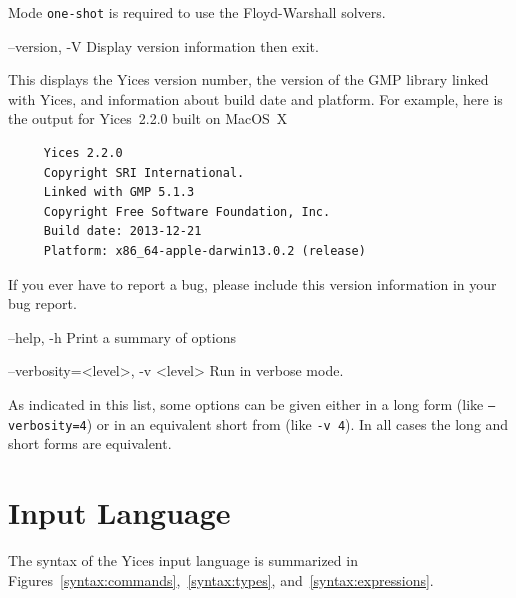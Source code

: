 \documentclass[11pt,twoside,fleqn,openright,titlepage]{cslreport}
\newenvironment{options}{
\begin{list}{}{
\setlength{\labelsep}{1.8ex}
\setlength{\labelwidth}{0pt}
\setlength{\itemindent}{-0.5\leftmargin}
\settowidth{\leftmargin}{\texttt{--}}
\renewcommand{\makelabel}{\optionlabel}}}
{\end{list}}
\newcommand*\optionlabel[1]{\hspace\labelsep\texttt{#1}}
\begin{document}
\begin{options}
  Mode \texttt{one-shot} is required to use the Floyd-Warshall solvers.

\item[--version, -V] Display version information then exit.

  This  displays the  Yices version  number,  the version  of the  GMP
  library  linked with  Yices, and  information about  build date  and
  platform. For example,  here is the output for  Yices~2.2.0 built on
  MacOS~X
  \begin{small}
  \begin{verbatim}
     Yices 2.2.0
     Copyright SRI International.
     Linked with GMP 5.1.3
     Copyright Free Software Foundation, Inc.
     Build date: 2013-12-21
     Platform: x86_64-apple-darwin13.0.2 (release)
  \end{verbatim}
  \end{small}
  \vspace*{-1em}
  If you ever have to report a bug, please include this version information
  in your bug report.

\item[--help, -h] Print a summary of options

\item[--verbosity=<level>, -v <level>] Run in verbose mode.
\end{options}
As indicated in this list, some options can be given either in a long
form (like \texttt{--verbosity=4}) or in an equivalent short from (like
\texttt{-v 4}). In all cases the long and short forms are equivalent.

\section{Input Language}

The   syntax  of   the   Yices  input   language   is  summarized   in
Figures~\ref{syntax:commands},~\ref{syntax:types},
and~\ref{syntax:expressions}.
\end{document}
